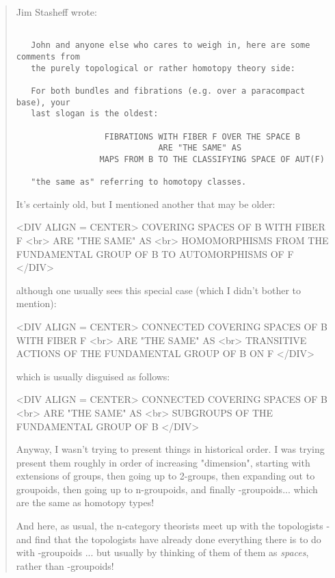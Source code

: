 \begin{quote}
 Jim Stasheff wrote:
 

\begin{verbatim}

   John and anyone else who cares to weigh in, here are some comments from 
   the purely topological or rather homotopy theory side:
 
   For both bundles and fibrations (e.g. over a paracompact base), your 
   last slogan is the oldest:
 
                  FIBRATIONS WITH FIBER F OVER THE SPACE B
                             ARE "THE SAME" AS
                 MAPS FROM B TO THE CLASSIFYING SPACE OF AUT(F)
 
   "the same as" referring to homotopy classes.
\end{verbatim}
    

 It's certainly old, but I mentioned another that may be older:

<DIV ALIGN = CENTER>
                    COVERING SPACES OF B WITH FIBER F <br>
                           ARE "THE SAME" AS <br>
    HOMOMORPHISMS FROM THE FUNDAMENTAL GROUP OF B TO AUTOMORPHISMS OF F
</DIV>

 although one usually sees this special case (which I didn't bother
 to mention):

<DIV ALIGN = CENTER>
                 CONNECTED COVERING SPACES OF B WITH FIBER F <br>
                            ARE "THE SAME" AS <br>
            TRANSITIVE ACTIONS OF THE FUNDAMENTAL GROUP OF B ON F
</DIV>

 which is usually disguised as follows:

<DIV ALIGN = CENTER>
                 CONNECTED COVERING SPACES OF B <br>
                           ARE "THE SAME" AS <br>
               SUBGROUPS OF THE FUNDAMENTAL GROUP OF B 
</DIV>

 Anyway, I wasn't trying to present things in historical order.  
 I was trying present them roughly in order of increasing
 "dimension", starting with extensions of groups, then going up to 
 2-groups, then expanding out to groupoids, then going up to n-groupoids,
 and finally \omega -groupoids... which are the same as homotopy types!

 And here, as usual, the n-category theorists meet up with the 
 topologists - and find that the topologists have already done everything 
 there is to do with \omega -groupoids ... but usually by thinking of 
 them of them as \emph{spaces}, rather than \omega -groupoids!  


\end{quote}
